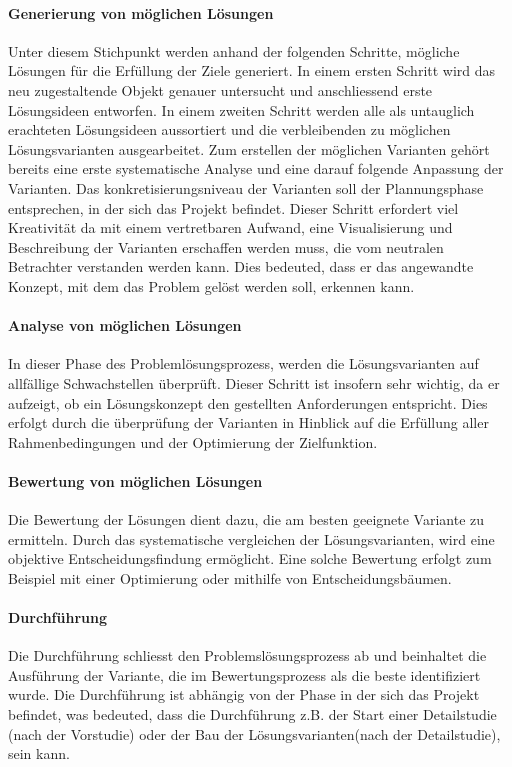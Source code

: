 \paragraph{Generierung von möglichen Lösungen} Unter diesem Stichpunkt werden anhand der folgenden Schritte, mögliche Lösungen für die Erfüllung der Ziele generiert. In einem ersten Schritt wird das neu zugestaltende Objekt genauer untersucht und anschliessend erste Lösungsideen entworfen. In einem zweiten Schritt werden alle als untauglich erachteten Lösungsideen aussortiert und die verbleibenden zu möglichen Lösungsvarianten ausgearbeitet. 
Zum erstellen der möglichen Varianten gehört bereits eine erste systematische Analyse und eine darauf folgende Anpassung der Varianten.
Das konkretisierungsniveau der Varianten soll der Plannungsphase entsprechen, in der sich das Projekt befindet. Dieser Schritt erfordert viel Kreativität da mit einem vertretbaren Aufwand, eine Visualisierung und Beschreibung der Varianten erschaffen werden muss, die vom neutralen Betrachter verstanden werden kann. Dies bedeuted, dass er das angewandte Konzept, mit dem das Problem gelöst werden soll, erkennen kann.

\paragraph{Analyse von möglichen Lösungen} In dieser Phase des Problemlösungsprozess, werden die Lösungsvarianten auf allfällige Schwachstellen überprüft. Dieser Schritt ist insofern sehr wichtig, da er aufzeigt, ob ein Lösungskonzept den gestellten Anforderungen entspricht. Dies erfolgt durch die überprüfung der Varianten in Hinblick auf die Erfüllung aller Rahmenbedingungen und der Optimierung der Zielfunktion. 

\paragraph{Bewertung von möglichen Lösungen} Die Bewertung der Lösungen dient dazu, die am besten geeignete Variante zu ermitteln. Durch das systematische vergleichen der Lösungsvarianten, wird eine objektive Entscheidungsfindung ermöglicht. Eine solche Bewertung erfolgt zum Beispiel mit einer Optimierung oder mithilfe von Entscheidungsbäumen. 

\paragraph{Durchführung} Die Durchführung schliesst den Problemslösungsprozess ab und beinhaltet die Ausführung der Variante, die im Bewertungsprozess als die beste identifiziert wurde. Die Durchführung ist abhängig von der Phase in der sich das Projekt befindet, was bedeuted, dass die Durchführung z.B. der Start einer Detailstudie (nach der Vorstudie) oder der Bau der Lösungsvarianten(nach der Detailstudie), sein kann.

